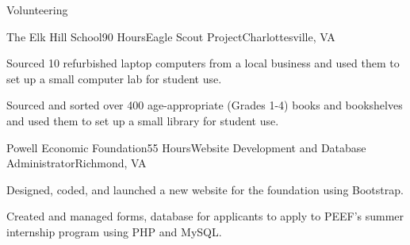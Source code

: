 \documentclass{resume} %
\begin{document}

\begin{rSection}{Volunteering}

\begin{rSubsection}{The Elk Hill School}{90 Hours}{Eagle Scout Project}{Charlottesville, VA}
\item Sourced 10 refurbished laptop computers from a local business and used them
to set up a small computer lab for student use.
\item Sourced and sorted over 400 age-appropriate (Grades 1-4) books and bookshelves and used them to set up a small library for student use.
\end{rSubsection}

\begin{rSubsection}{Powell Economic Foundation}{55 Hours}{Website Development and Database Administrator}{Richmond, VA}
\item Designed, coded, and launched a new  website for the foundation using Bootstrap.
\item Created and managed forms, database for applicants to apply to PEEF's summer internship program using PHP and MySQL.
\end{rSubsection}

\end{rSection}







\end{document}
